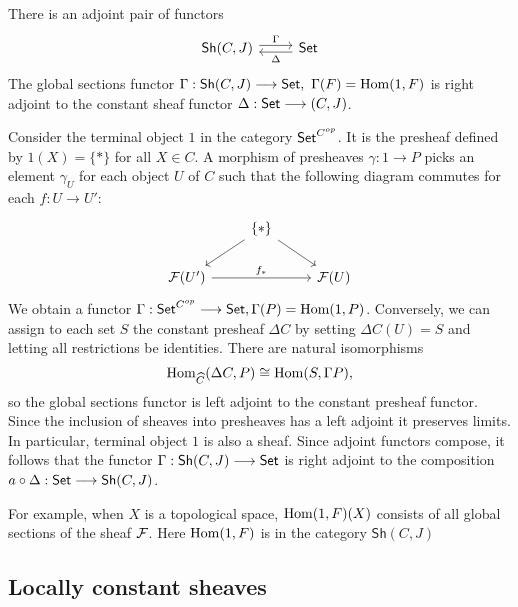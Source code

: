 \begin{theorem}
	There is an adjoint pair of functors
	\[
		\begin{tikzcd}
			{\mathsf{Sh}(C,J)} & \Set
			\arrow["\Delta", shift left=1, from=1-2, to=1-1]
			\arrow["\Gamma", shift left=1, from=1-1, to=1-2]
		\end{tikzcd}
	\]
	The global sections functor $\Gamma: \mathsf{Sh}(C,J) \longrightarrow \mathsf{Set},\ \Gamma(F) = \operatorname{Hom}(1,F)$ is right adjoint to the constant sheaf functor $\Delta: \mathsf{Set} \longrightarrow \mathcal{(}C,J)$.
\end{theorem}

Consider the terminal object $1$ in the category $\mathsf{Set}^{C^{op}}$. It is the presheaf defined by $1(X) = \{*\}$ for all $X \in C$. A morphism of presheaves $\gamma: 1 \to P$ picks an element $\gamma_U$ for each object $U$ of $C$ such that the following diagram commutes for each $f: U \to U'$:
\[ \begin{tikzcd}
	& {\{*\}} \\
	{\Sh{F}(U')} && {\Sh{F}(U)}
	\arrow[from=1-2, to=2-1]
	\arrow["{f_*}", from=2-1, to=2-3]
	\arrow[from=1-2, to=2-3]
\end{tikzcd}
\]
We obtain a functor $\Gamma: \mathsf{Set}^{C^{op}} \longrightarrow \mathsf{Set}, \Gamma(P) = \operatorname{Hom}(1, P)$. Conversely, we can assign to each set $S$ the constant presheaf $\Delta C$ by setting $\Delta C(U) = S$ and letting all restrictions be identities. There are natural isomorphisms
\[\operatorname{Hom}_{\widehat{C}}(\Delta C, P) \cong \operatorname{Hom}(S, \Gamma P),\]
so the global sections functor is left adjoint to the constant presheaf functor.
Since the inclusion of sheaves into presheaves has a left adjoint it preserves limits. In particular, terminal object $1$ is also a sheaf. Since adjoint functors compose, it follows that the functor $\Gamma : \mathsf{Sh}(C,J) \longrightarrow \mathsf{Set}$ is right adjoint to the composition $a \circ \Delta: \mathsf{Set} \longrightarrow \mathsf{Sh}(C,J)$. 


For example, when $X$ is a topological space, $\operatorname{Hom}(1,F)(X)$ consists of all global sections of the sheaf $\mathcal{F}$. Here $\operatorname{Hom}(1,F)$ is in the category $\mathsf{Sh}(C,J)$
\subsection{Locally constant sheaves}
